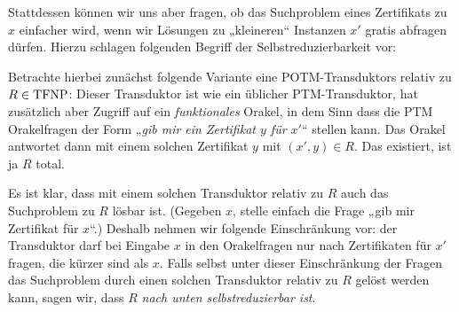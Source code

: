 Stattdessen können wir uns aber fragen, ob das Suchproblem eines Zertifikats zu $x$ einfacher wird, wenn wir Lösungen zu „kleineren“ Instanzen $x'$ gratis abfragen dürfen.
Hierzu schlagen \citeauthor{harsha_downward_2023} folgenden Begriff der Selbstreduzierbarkeit vor:

Betrachte hierbei zunächst folgende Variante eine POTM-Transduktors relativ zu $R\in\mathrm{TFNP}$: Dieser Transduktor ist wie ein üblicher PTM-Transduktor, hat zusätzlich aber Zugriff auf ein \emph{funktionales} Orakel, in dem Sinn dass die PTM Orakelfragen der Form „\emph{gib mir ein Zertifikat $y$ für $x'$}“ stellen kann. Das Orakel antwortet dann mit einem solchen Zertifikat $y$ mit $(x', y)\in R$. Das existiert, ist ja $R$ total. 

Es ist klar, dass mit einem solchen Transduktor relativ zu $R$ auch das Suchproblem zu $R$ lösbar ist. (Gegeben $x$, stelle einfach die Frage „gib mir Zertifikat für $x$“.) Deshalb nehmen wir folgende Einschränkung vor: der Transduktor darf bei Eingabe $x$ in den Orakelfragen nur nach Zertifikaten für $x'$ fragen, die kürzer sind als $x$.
Falls selbst unter dieser Einschränkung der Fragen das Suchproblem durch einen solchen Transduktor relativ zu $R$ gelöst werden kann, sagen wir, dass $R$ \emph{nach unten selbstreduzierbar ist}.

